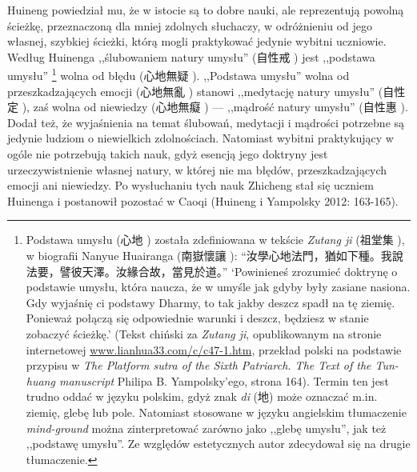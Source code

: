 Huineng powiedział mu, że w istocie są to dobre nauki, ale reprezentują powolną ścieżkę, przeznaczoną dla mniej zdolnych słuchaczy, w odróżnieniu od jego własnej, szybkiej ścieżki, którą mogli praktykować jedynie wybitni uczniowie.
Według Huinenga ,,ślubowaniem natury umysłu'' (自性戒 ) jest ,,podstawa umysłu''%
\footnote{Podstawa umysłu (心地 ) została zdefiniowana w tekście \textit{Zutang ji} (祖堂集 ), w biografii Nanyue Huairanga (南嶽懷讓 ): “汝學心地法門，猶如下種。我說法要，譬彼天澤。汝緣合故，當見於道。”
`Powinieneś zrozumieć doktrynę o podstawie umysłu, która naucza, że w umyśle jak gdyby były zasiane nasiona. Gdy wyjaśnię ci podstawy Dharmy, to tak jakby deszcz spadł na tę ziemię. Ponieważ połączą się odpowiednie warunki i deszcz, będziesz w stanie zobaczyć ścieżkę.' (Tekst chiński za \textit{Zutang ji}, opublikowanym na stronie internetowej \url{www.lianhua33.com/c/c47-1.htm}, przekład polski na podstawie przypisu w \textit{The Platform sutra of the Sixth Patriarch. The Text of the Tun-huang manuscript} Philipa B. Yampolsky'ego, strona 164). Termin ten jest trudno oddać w języku polskim, gdyż znak \textit{di} (地) może oznaczać m.in. ziemię, glebę lub pole. Natomiast stosowane w języku angielskim tłumaczenie \textit{mind-ground} można zinterpretować zarówno jako ,,glebę umysłu'', jak też ,,podstawę umysłu''. Ze względów estetycznych autor zdecydował się na drugie tłumaczenie.}
wolna od błędu (心地無疑 ).
,,Podstawa umysłu'' wolna od przeszkadzających emocji (心地無亂 ) stanowi ,,medytację natury umysłu'' (自性定 ), zaś wolna od niewiedzy (心地無癡 ) --- ,,mądrość natury umysłu'' (自性惠 ).
Dodał też, że wyjaśnienia na temat ślubowań, medytacji i mądrości potrzebne są jedynie ludziom o niewielkich zdolnościach.
Natomiast wybitni praktykujący w ogóle nie potrzebują takich nauk, gdyż esencją jego doktryny jest urzeczywistnienie własnej natury, w której nie ma błędów, przeszkadzających emocji ani niewiedzy.
Po wysłuchaniu tych nauk Zhicheng stał się uczniem Huinenga i postanowił pozostać w Caoqi
(Huineng i Yampolsky 2012: 163-165).

